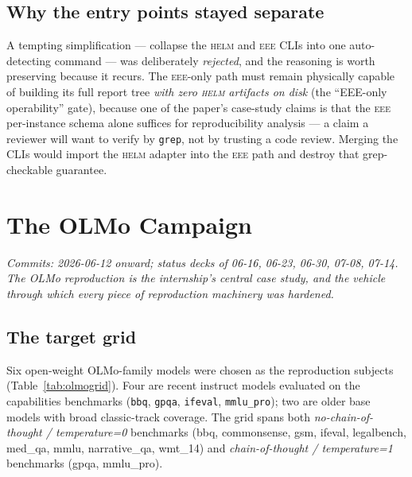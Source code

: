 \documentclass[11pt]{report}
\newcommand{\eeeshort}{\textsc{eee}\xspace}
\newcommand{\code}[1]{\texttt{#1}}
\begin{document}
\section{Why the entry points stayed separate}

A tempting simplification --- collapse the \textsc{helm} and \eeeshort CLIs into
one auto-detecting command --- was deliberately \emph{rejected}, and the reasoning
is worth preserving because it recurs. The \eeeshort-only path must remain
physically capable of building its full report tree \emph{with zero \textsc{helm}
artifacts on disk} (the ``EEE-only operability'' gate), because one of the paper's
case-study claims is that the \eeeshort per-instance schema alone suffices for
reproducibility analysis --- a claim a reviewer will want to verify by
\code{grep}, not by trusting a code review. Merging the CLIs would import the
\textsc{helm} adapter into the \eeeshort path and destroy that grep-checkable
guarantee.

\chapter{The OLMo Campaign}
\label{chap:olmo}

\emph{Commits: 2026-06-12 onward; status decks of 06-16, 06-23, 06-30, 07-08,
07-14. The OLMo reproduction is the internship's central case study, and the
vehicle through which every piece of reproduction machinery was hardened.}

\section{The target grid}

Six open-weight OLMo-family models were chosen as the reproduction subjects
(Table~\ref{tab:olmogrid}). Four are recent instruct models evaluated on the
capabilities benchmarks (\code{bbq}, \code{gpqa}, \code{ifeval}, \code{mmlu\_pro});
two are older base models with broad classic-track coverage. The grid spans both
\emph{no-chain-of-thought / temperature=0} benchmarks (bbq, commonsense, gsm,
ifeval, legalbench, med\_qa, mmlu, narrative\_qa, wmt\_14) and \emph{chain-of-thought
/ temperature=1} benchmarks (gpqa, mmlu\_pro).
\end{document}
